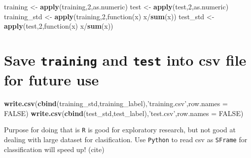 \documentclass[]{article}
\newenvironment{Shaded}{\begin{snugshade}}{\end{snugshade}}
\newcommand{\KeywordTok}[1]{\textcolor[rgb]{0.13,0.29,0.53}{\textbf{{#1}}}}
\newcommand{\DataTypeTok}[1]{\textcolor[rgb]{0.13,0.29,0.53}{{#1}}}
\newcommand{\DecValTok}[1]{\textcolor[rgb]{0.00,0.00,0.81}{{#1}}}
\newcommand{\StringTok}[1]{\textcolor[rgb]{0.31,0.60,0.02}{{#1}}}
\newcommand{\OtherTok}[1]{\textcolor[rgb]{0.56,0.35,0.01}{{#1}}}
\newcommand{\NormalTok}[1]{{#1}}
\begin{document}
\begin{Shaded}
\begin{Highlighting}[]
\NormalTok{training <-}\StringTok{ }\KeywordTok{apply}\NormalTok{(training,}\DecValTok{2}\NormalTok{,as.numeric)}
\NormalTok{test <-}\StringTok{ }\KeywordTok{apply}\NormalTok{(test,}\DecValTok{2}\NormalTok{,as.numeric)}
\NormalTok{training_std <-}\StringTok{ }\KeywordTok{apply}\NormalTok{(training,}\DecValTok{2}\NormalTok{,function(x) x/}\KeywordTok{sum}\NormalTok{(x))}
\NormalTok{test_std <-}\StringTok{ }\KeywordTok{apply}\NormalTok{(test,}\DecValTok{2}\NormalTok{,function(x) x/}\KeywordTok{sum}\NormalTok{(x))}
\end{Highlighting}
\end{Shaded}

\section{Save \texttt{training} and \texttt{test} into csv file for
future use}\label{save-training-and-test-into-csv-file-for-future-use}

\begin{Shaded}
\begin{Highlighting}[]
\KeywordTok{write.csv}\NormalTok{(}\KeywordTok{cbind}\NormalTok{(training_std,training_label),}\StringTok{'training.csv'}\NormalTok{,}\DataTypeTok{row.names =} \OtherTok{FALSE}\NormalTok{)}
\KeywordTok{write.csv}\NormalTok{(}\KeywordTok{cbind}\NormalTok{(test_std,test_label),}\StringTok{'test.csv'}\NormalTok{,}\DataTypeTok{row.names =} \OtherTok{FALSE}\NormalTok{)}
\end{Highlighting}
\end{Shaded}

Purpose for doing that is \texttt{R} is good for exploratory research,
but not good at dealing with large dataset for clasification. Use
\texttt{Python} to read csv as \texttt{SFrame} for classification will
speed up! (cite)
\end{document}
